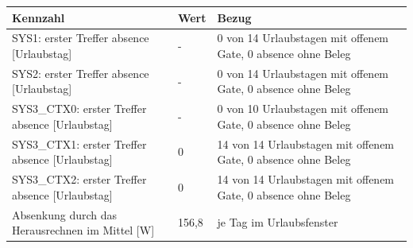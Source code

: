\begin{tabular}{lll}
\toprule
Kennzahl & Wert & Bezug \\
\midrule
SYS1: erster Treffer absence [Urlaubstag] & - & 0 von 14 Urlaubstagen mit offenem Gate, 0 \texttimes{} absence ohne Beleg \\
SYS2: erster Treffer absence [Urlaubstag] & - & 0 von 14 Urlaubstagen mit offenem Gate, 0 \texttimes{} absence ohne Beleg \\
SYS3\_CTX0: erster Treffer absence [Urlaubstag] & - & 0 von 10 Urlaubstagen mit offenem Gate, 0 \texttimes{} absence ohne Beleg \\
SYS3\_CTX1: erster Treffer absence [Urlaubstag] & 0 & 14 von 14 Urlaubstagen mit offenem Gate, 0 \texttimes{} absence ohne Beleg \\
SYS3\_CTX2: erster Treffer absence [Urlaubstag] & 0 & 14 von 14 Urlaubstagen mit offenem Gate, 0 \texttimes{} absence ohne Beleg \\
Absenkung durch das Herausrechnen im Mittel [W] & 156,8 & je Tag im Urlaubsfenster \\
\bottomrule
\end{tabular}

